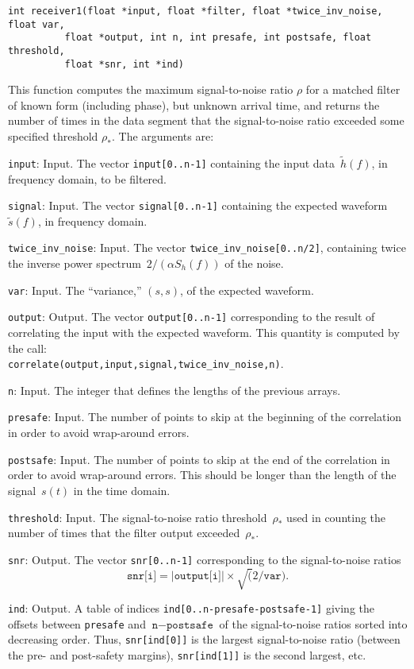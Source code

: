 \begin{verbatim}
int receiver1(float *input, float *filter, float *twice_inv_noise, float var,
	      float *output, int n, int presafe, int postsafe, float threshold,
	      float *snr, int *ind)
\end{verbatim}

This function computes the maximum signal-to-noise ratio $\rho$ for a matched
filter of known form (including phase), but unknown arrival time, and returns
the number of times in the data segment that the signal-to-noise ratio exceeded
some specified threshold $\rho_\ast$.  The arguments are:
\begin{description}
\item{\texttt{input}}: Input.  The vector \texttt{input[0..n-1]} containing
  the input data~$\tilde{h}(f)$, in frequency domain, to be filtered.
\item{\texttt{signal}}: Input.  The vector \texttt{signal[0..n-1]} containing
  the expected waveform~$\tilde{s}(f)$, in frequency domain.
\item{\texttt{twice\_inv\_noise}}: Input.  The vector
  \texttt{twice\_inv\_noise[0..n/2]}, containing twice the inverse power
  spectrum~$2/(\alpha S_h(f))$ of the noise.
\item{\texttt{var}}: Input.  The ``variance,'' $(s,s)$, of the
  expected waveform.
\item{\texttt{output}}: Output.  The vector \texttt{output[0..n-1]}
  corresponding to the result of correlating the input with the expected
  waveform.  This quantity is computed by the call:\\
  \texttt{correlate(output,input,signal,twice\_inv\_noise,n)}.
\item{\texttt{n}}: Input.  The integer that defines the lengths of the
  previous arrays.
\item{\texttt{presafe}}: Input.  The number of points to skip at the beginning
  of the correlation in order to avoid wrap-around errors.
\item{\texttt{postsafe}}: Input.  The number of points to skip at the end
  of the correlation in order to avoid wrap-around errors.  This should be
  longer than the length of the signal~$s(t)$ in the time domain.
\item{\texttt{threshold}}: Input.  The signal-to-noise ratio
  threshold~$\rho_\ast$ used in counting the number of times that the filter
  output exceeded~$\rho_\ast$.
\item{\texttt{snr}}: Output.  The vector \texttt{snr[0..n-1]}
  corresponding to the signal-to-noise ratios
  \[
     \texttt{snr[i]}=|\texttt{output[i]}|\times\surd(2/\texttt{var}).
  \]
\item{\texttt{ind}}: Output.  A table of indices
  \texttt{ind[0..n-presafe-postsafe-1]} giving the offsets between
  \texttt{presafe} and $\texttt{n}-\texttt{postsafe}$ of the signal-to-noise
  ratios sorted into decreasing order.  Thus,
  \texttt{snr[ind[0]]} is the largest signal-to-noise ratio (between the pre-
  and post-safety margins), \texttt{snr[ind[1]]} is the second largest, etc.
\end{description}

